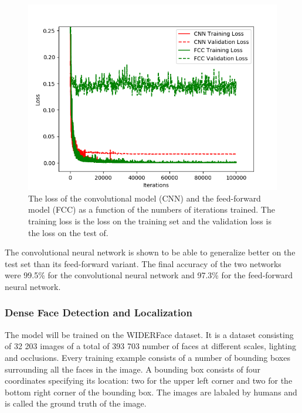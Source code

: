 \documentclass[a4paper,11pt,twoside]{article}
\begin{document}
\begin{figure}[h]
	\centering
  		\includegraphics[scale=0.4]{losses.png}
  	\caption{The loss of the convolutional model (CNN) and the feed-forward model (FCC) as a function of the numbers of iterations trained. The training loss is the loss on the training set and the validation loss is the loss on the test of.} \label{figacc}
\end{figure}

The convolutional neural network is shown to be able to generalize better on the test set than its feed-forward variant. The final accuracy of the two networks were 99.5\% for the convolutional neural network and 97.3\% for the feed-forward neural network. 

\subsubsection{Dense Face Detection and Localization}
The model will be trained on the WIDERFace dataset. It is a dataset consisting of 32 203 images of a total of 393 703 number of faces at different scales, lighting and occlusions. Every training example consists of a number of bounding boxes surrounding all the faces in the image. A bounding box consists of four coordinates specifying its location: two for the upper left corner and two for the bottom right corner of the bounding box. The images are labaled by humans and is called the ground truth of the image. \cite{WIDERFace}
\end{document}
